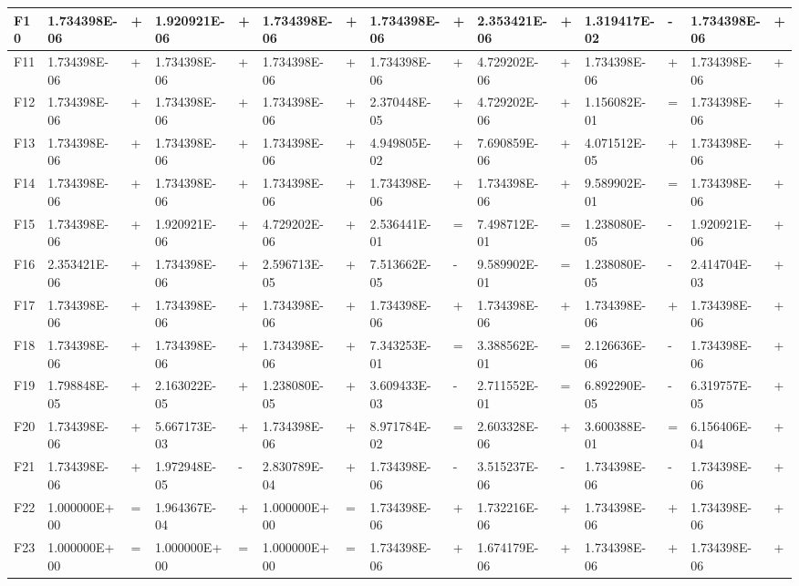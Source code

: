 \documentclass{article} %
\begin{document}
\begin{tabular}{|p{0.3in}|p{0.5in}|p{0.2in}|p{0.5in}|p{0.2in}|p{0.6in}|p{0.1in}|p{0.6in}|p{0.1in}|p{0.5in}|p{0.1in}|p{0.5in}|p{0.1in}|p{0.5in}|p{0.2in}|}
F10 & 1.734398E-06 & + & 1.920921E-06 & + & 1.734398E-06 & + & 1.734398E-06 & + & 2.353421E-06 & + & 1.319417E-02 & - & 1.734398E-06 & + \\ \hline 
F11 & 1.734398E-06 & + & 1.734398E-06 & + & 1.734398E-06 & + & 1.734398E-06 & + & 4.729202E-06 & + & 1.734398E-06 & + & 1.734398E-06 & + \\ \hline 
F12 & 1.734398E-06 & + & 1.734398E-06 & + & 1.734398E-06 & + & 2.370448E-05 & + & 4.729202E-06 & + & 1.156082E-01 & = & 1.734398E-06 & + \\ \hline 
F13 & 1.734398E-06 & + & 1.734398E-06 & + & 1.734398E-06 & + & 4.949805E-02 & + & 7.690859E-06 & + & 4.071512E-05 & + & 1.734398E-06 & + \\ \hline 
F14 & 1.734398E-06 & + & 1.734398E-06 & + & 1.734398E-06 & + & 1.734398E-06 & + & 1.734398E-06 & + & 9.589902E-01 & = & 1.734398E-06 & + \\ \hline 
F15 & 1.734398E-06 & + & 1.920921E-06 & + & 4.729202E-06 & + & 2.536441E-01 & = & 7.498712E-01 & = & 1.238080E-05 & - & 1.920921E-06 & + \\ \hline 
F16 & 2.353421E-06 & + & 1.734398E-06 & + & 2.596713E-05 & + & 7.513662E-05 & - & 9.589902E-01 & = & 1.238080E-05 & - & 2.414704E-03 & + \\ \hline 
F17 & 1.734398E-06 & + & 1.734398E-06 & + & 1.734398E-06 & + & 1.734398E-06 & + & 1.734398E-06 & + & 1.734398E-06 & + & 1.734398E-06 & + \\ \hline 
F18 & 1.734398E-06 & + & 1.734398E-06 & + & 1.734398E-06 & + & 7.343253E-01 & = & 3.388562E-01 & = & 2.126636E-06 & - & 1.734398E-06 & + \\ \hline 
F19 & 1.798848E-05 & + & 2.163022E-05 & + & 1.238080E-05 & + & 3.609433E-03 & - & 2.711552E-01 & = & 6.892290E-05 & - & 6.319757E-05 & + \\ \hline 
F20 & 1.734398E-06 & + & 5.667173E-03 & + & 1.734398E-06 & + & 8.971784E-02 & = & 2.603328E-06 & + & 3.600388E-01 & = & 6.156406E-04 & + \\ \hline 
F21 & 1.734398E-06 & + & 1.972948E-05 & - & 2.830789E-04 & + & 1.734398E-06 & - & 3.515237E-06 & - & 1.734398E-06 & - & 1.734398E-06 & + \\ \hline 
F22 & 1.000000E+00 & = & 1.964367E-04 & + & 1.000000E+00 & = & 1.734398E-06 & + & 1.732216E-06 & + & 1.734398E-06 & + & 1.734398E-06 & + \\ \hline 
F23 & 1.000000E+00 & = & 1.000000E+00 & = & 1.000000E+00 & = & 1.734398E-06 & + & 1.674179E-06 & + & 1.734398E-06 & + & 1.734398E-06 & + \\ \hline 

\end{tabular}
\end{document}
